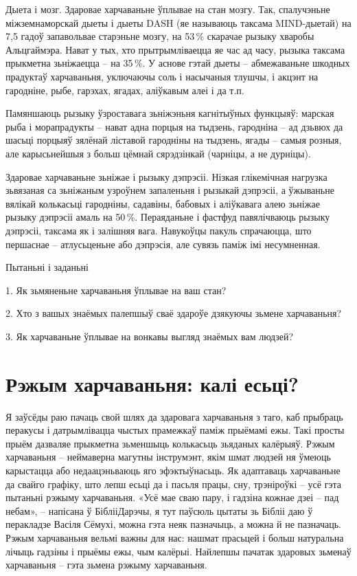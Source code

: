Дыета і мозг. Здаровае харчаваньне ўплывае на стан мозгу. Так, спалучэньне міжземнаморскай дыеты і дыеты DASH (яе называюць таксама MIND-дыетай) на 7,5 гадоў запавольвае старэньне мозгу, на 53\,\% скарачае рызыку хваробы Альцгаймэра. Нават у тых, хто прытрымліваецца яе час ад часу, рызыка таксама прыкметна зьніжаецца – на 35\,\%. У аснове гэтай дыеты – абмежаваньне шкодных прадуктаў харчаваньня, уключаючы соль і насычаныя тлушчы, і акцэнт на гародніне, рыбе, гарэхах, ягадах, аліўкавым алеі і да т.п.

Памяншаюць рызыку ўзроставага зьніжэньня кагнітыўных функцыяў: марская рыба і морапрадукты – нават адна порцыя на тыдзень, гародніна – ад дзьвюх да шасьці порцыяў зялёнай ліставой гародніны на тыдзень, ягады – самыя розныя, але карысьнейшыя з больш цёмнай сярэдзінкай (чарніцы, а не дурніцы).

Здаровае харчаваньне зьніжае і рызыку дэпрэсіі. Нізкая глікемічная нагрузка зьвязаная са зьніжаным узроўнем запаленьня і рызыкай дэпрэсіі, а ўжываньне вялікай колькасьці гародніны, садавіны, бабовых і аліўкавага алею зьніжае рызыку дэпрэсіі амаль на 50\,\%. Пераяданьне і фастфуд павялічваюць рызыку дэпрэсіі, таксама як і залішняя вага. Навукоўцы пакуль спрачаюцца, што першаснае – атлусьценьне або дэпрэсія, але сувязь паміж імі несумненная.

Пытаньні і заданьні

1. Як зьмяненьне харчаваньня ўплывае на ваш стан?

2. Хто з вашых знаёмых палепшыў сваё здароўе дзякуючы зьмене харчаваньня?

3. Як харчаваньне ўплывае на вонкавы выгляд знаёмых вам людзей?


\section{Рэжым харчаваньня: калі есьці?}

Я заўсёды раю пачаць свой шлях да здаровага харчаваньня з таго, каб прыбраць перакусы і датрымлівацца чыстых прамежкаў паміж прыёмамі ежы. Такі просты прыём дазваляе прыкметна зьменшыць колькасьць зьяданых калёрыяў. Рэжым харчаваньня – неймаверна магутны інструмэнт, якім шмат людзей ня ўмеюць карыстацца або недаацэньваюць яго эфэктыўнасьць. Як адаптаваць харчаваньне да свайго графіку, што лепш есьці да і пасьля працы, сну, трэніроўкі – усё гэта пытаньні рэжыму харчаваньня. «Усё мае сваю пару, і гадзіна кожнае дзеі – пад небам», – напісана ў БіблііДарэчы, я тут паўсюль цытаты зь Бібліі даю ў перакладзе Васіля Сёмухі, можна гэта неяк пазначыць, а можна й не пазначаць. Рэжым харчаваньня вельмі важны для нас: нашмат прасьцей і больш натуральна лічыць гадзіны і прыёмы ежы, чым калёрыі. Найлепшы пачатак здаровых зьменаў харчаваньня – гэта зьмена рэжыму харчаваньня.

